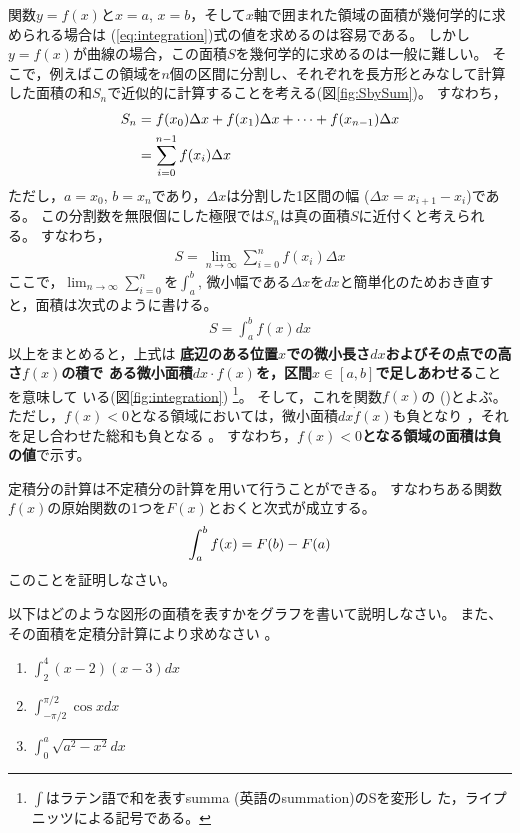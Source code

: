\documentclass[twocolumn,11pt]{jarticle}
\begin{document}
関数$y=f(x)$と$x=a$, $x=b$，そして$x$軸で囲まれた領域の面積が幾何学的に求められる場合は
(\ref{eq:integration})式の値を求めるのは容易である。
しかし$y=f(x)$が曲線の場合，この面積$S$を幾何学的に求めるのは一般に難しい。
そこで，例えばこの領域を$n$個の区間に分割し、それぞれを長方形とみなして計算
した面積の和$S_n$で近似的に計算することを考える(図\ref{fig:SbySum})。
すなわち，
\begin{align}
  S_n&=f(x_0)\Delta x+f(x_1)\Delta x+\cdots+f(x_{n-1})\Delta x\notag\\
  &=\sum_{i=0}^{n-1}f(x_i)\Delta x
\end{align}
ただし，$a=x_0$, $b=x_n$であり，$\Delta x$は分割した1区間の幅
($\Delta x=x_{i+1}-x_i$)である。
この分割数を無限個にした極限では$S_n$は真の面積$S$に近付くと考えられる。
すなわち，
\begin{align*}
  S=\lim_{n\to \infty}\sum_{i=0}^nf(x_i)\Delta x
\end{align*}
ここで，$\displaystyle\lim_{n\to \infty}\sum_{i=0}^n$を$\displaystyle\int_a^b$,
微小幅である$\Delta x$を$dx$と簡単化のためおき直すと，面積は次式のように書ける。
\begin{align}
\label{eq:integration2}
  S=\int_a^bf(x)dx
\end{align}
以上をまとめると，上式は
\textbf{底辺のある位置$x$での微小長さ$dx$およびその点での高さ$f(x)$の積で
ある微小面積$dx\cdot f(x)$を，区間$x\in[a,b]$で足しあわせる}ことを意味して
いる(図\ref{fig:integration})
\footnote{$\int$はラテン語で和を表すsumma (英語のsummation)のSを変形し
  た，ライプニッツによる記号である。}。
そして，これを関数$f(x)$の
()とよぶ。
ただし，$f(x)<0$となる領域においては，微小面積$dx\dot f(x)$も負となり ，それを足し合わせた総和も負となる 。
すなわち，\textbf{$f(x)<0$となる領域の面積は負の値}で示す。

\question
定積分の計算は不定積分の計算を用いて行うことができる。
すなわちある関数$f(x)$の原始関数の1つを$F(x)$とおくと次式が成立する。
\begin{align}
  \int_a^bf(x)=F(b)-F(a)\notag
\end{align}
このことを証明しなさい。

\nexercise
以下はどのような図形の面積を表すかをグラフを書いて説明しなさい。
また、その面積を定積分計算により求めなさい
。
\begin{enumerate}
\item\label{iitem:int_2^4(x-2)(x-3)dx} $\displaystyle\int_2^4(x-2)(x-3) dx$
\item\label{iitem:int_(-pi/2)^(pi/2)cos xdx}
  $\displaystyle\int_{-\pi/2}^{\pi/2}\cos x dx$
\item\label{iitem:int_0^asqrt(a^2-x^2)dx} $\displaystyle\int_0^a \sqrt{a^2-x^2}dx$
\end{enumerate}
\end{document}
